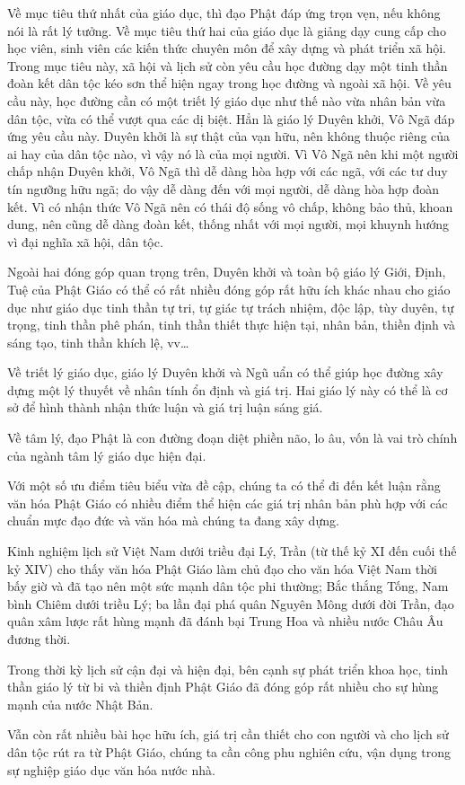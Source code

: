 Về mục tiêu thứ nhất của giáo dục, thì đạo Phật đáp ứng trọn vẹn, nếu không nói là rất lý tưởng. Về mục tiêu thứ hai của giáo dục là giảng dạy cung cấp cho học viên, sinh viên các kiến thức chuyên môn để xây dựng và phát triển xã hội. Trong mục tiêu này, xã hội và lịch sử còn yêu cầu học đường dạy một tinh thần đoàn kết dân tộc kéo sơn thể hiện ngay trong học đường và ngoài xã hội. Về yêu cầu này, học đường cần có một triết lý giáo dục như thế nào vừa nhân bản vừa dân tộc, vừa có thể vượt qua các dị biệt. Hẳn là giáo lý Duyên khởi, Vô Ngã đáp ứng yêu cầu này. Duyên khởi là sự thật của vạn hữu, nên không thuộc riêng của ai hay của dân tộc nào, vì vậy nó là của mọi người. Vì Vô Ngã nên khi một người chấp nhận Duyên khởi, Vô Ngã thì dễ dàng hòa hợp với các ngã, với các tư duy tín ngưỡng hữu ngã; do vậy dễ dàng đến với mọi người, dễ dàng hòa hợp đoàn kết. Vì có nhận thức Vô Ngã nên có thái độ sống vô chấp, không bảo thủ, khoan dung, nên cũng dễ dàng đoàn kết, thống nhất với mọi người, mọi khuynh hướng vì đại nghĩa xã hội, dân tộc.

Ngoài hai đóng góp quan trọng trên, Duyên khởi và toàn bộ giáo lý Giới, Định, Tuệ của Phật Giáo có thể có rất nhiều đóng góp rất hữu ích khác nhau cho giáo dục như giáo dục tinh thần tự tri, tự giác tự trách nhiệm, độc lập, tùy duyên, tự trọng, tinh thần phê phán, tinh thần thiết thực hiện tại, nhân bản, thiền định và sáng tạo, tinh thần khích lệ, vv\ldots

Về triết lý giáo dục, giáo lý Duyên khởi và Ngũ uẩn có thể giúp học đường xây dựng một lý thuyết về nhân tính ổn định và giá trị. Hai giáo lý này có thể là cơ sở để hình thành nhận thức luận và giá trị luận sáng giá.

Về tâm lý, đạo Phật là con đường đoạn diệt phiền não, lo âu, vốn là vai trò chính của ngành tâm lý giáo dục hiện đại.

Với một số ưu điểm tiêu biểu vừa đề cập, chúng ta có thể đi đến kết luận rằng văn hóa Phật Giáo có nhiều điểm thể hiện các giá trị nhân bản phù hợp với các chuẩn mực đạo đức và văn hóa mà chúng ta đang xây dựng.

Kinh nghiệm lịch sử Việt Nam dưới triều đại Lý, Trần (từ thế kỷ XI đến cuối thế kỷ XIV) cho thấy văn hóa Phật Giáo làm chủ đạo cho văn hóa Việt Nam thời bấy giờ và đã tạo nên một sức mạnh dân tộc phi thường; Bắc thắng Tống, Nam bình Chiêm dưới triều Lý; ba lần đại phá quân Nguyên Mông dưới đời Trần, đạo quân xâm lược rất hùng mạnh đã đánh bại Trung Hoa và nhiều nước Châu Âu đương thời.

Trong thời kỳ lịch sử cận đại và hiện đại, bên cạnh sự phát triển khoa học, tinh thần giáo lý từ bi và thiền định Phật Giáo đã đóng góp rất nhiều cho sự hùng mạnh của nước Nhật Bản.

Vẫn còn rất nhiều bài học hữu ích, giá trị cần thiết cho con người và cho lịch sử dân tộc rút ra từ Phật Giáo, chúng ta cần công phu nghiên cứu, vận dụng trong sự nghiệp giáo dục văn hóa nước nhà.

